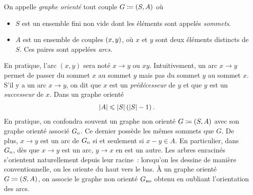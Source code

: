 \documentclass{magnolia}
\begin{document}
\begin{definition}
On appelle \emph{graphe orienté} tout couple $G\coloneqq\left(S,A\right)$ où
\begin{itemize}
\item $S$ est un ensemble fini non vide dont les éléments sont appelés
  \emph{sommets}.
\item $A$ est un ensemble de couples $\left(x,y\right)$, où $x$ et $y$ sont deux éléments
  distincts de $S$. Ces paires sont appelées \emph{arcs}.
\end{itemize}
\end{definition}
    
\begin{remarques}
\remarque En pratique, l'arc $(x,y)$ sera noté $x\to y$ ou $xy$. Intuitivement, un arc
  $x\to y$ permet de passer du sommet $x$ au sommet $y$ mais pas
  du sommet $y$ au sommet $x$. S'il y a un arc $x\to y$, on dit que $x$ est un
  \emph{prédécesseur} de $y$ et que $y$ est un \emph{successeur} de $x$.
\remarque Dans un graphe orienté
  \[\left|A\right|\leqslant \left|S\right|\left(\left|S\right|-1\right).\]
\remarque En pratique, on confondra souvent un graphe
  non orienté $G\coloneqq(S, A)$ avec son graphe orienté associé $G_{\rm o}$.
  Ce dernier possède les mêmes sommets que $G$. De plus, $x\to y$ est un arc de $G_{\rm o}$ si et
  seulement si $x-y\in A$. En particulier, dans $G_{\rm o}$,  dès que $x\to y$ est un arc,
  $y\to x$ en est un autre.
\remarque Les arbres enracinés s'orientent naturellement depuis leur racine~: lorsqu'on
  les dessine de manière conventionnelle, on les oriente du haut vers le bas. 
\remarque À un graphe orienté $G\coloneqq(S, A)$, on associe le graphe non orienté
  $G_{\rm no}$ obtenu en \og oubliant \fg l'orientation des arcs.
\end{remarques}
    
\end{document}
